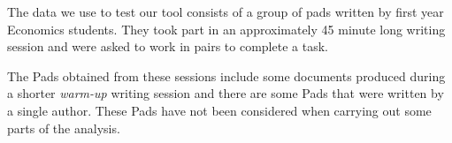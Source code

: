 The data we use to test our tool consists of a group of pads written by first year Economics students. They took part in an approximately 45 minute long writing session and were asked to work in pairs to complete a task.

The Pads obtained from these sessions include some documents produced during a shorter \textit{warm-up} writing session and there are some Pads that were written by a single author. These Pads have not been considered when carrying out some parts of the analysis.